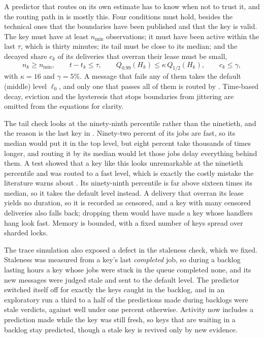 A predictor that routes on its own estimate has to know when not to trust it, and the routing path in  is mostly this. Four conditions must hold, besides the technical
ones that the boundaries have been published and that the key is valid. The key must have at least $n_{\min}$ observations; it must have been active within the last $\tau$, which is thirty minutes;
its tail must be close to its median; and the decayed share $c_k$ of its deliveries that overran their lease must be small,
\begin{equation}
  n_k \ge n_{\min},
  \qquad
  t - t_k \le \tau,
  \qquad
  Q_{0.99}(H_k) \le \kappa\,Q_{1/2}(H_k),
  \qquad
  c_k \le \gamma,
  \label{eq:trust}
\end{equation}
with $\kappa=16$ and $\gamma=5\%$. A message that fails any of them takes the default (middle) level $\ell_0$, and only one that passes all of them is routed by .
Time-based decay, eviction and the hysteresis that stops boundaries from jittering are omitted from the equations for clarity.

The tail check looks at the ninety-ninth percentile rather than the ninetieth, and the reason is the last key in . Ninety-two percent of its jobs are fast, so its median would
put it in the top level, but eight percent take thousands of times longer, and routing it by its median would let those jobs delay everything behind them. A test showed that a key like this looks unremarkable at
the ninetieth percentile and was routed to a fast level, which is exactly the costly mistake the literature warns about \citep{dellamico2014}. Its ninety-ninth percentile is far above sixteen times its
median, so it takes the default level instead. A delivery that overran its lease yields no duration, so it is recorded as censored, and a key with many censored deliveries also falls back; dropping them
would have made a key whose handlers hang look fast. Memory is bounded, with a fixed number of keys spread over sharded locks.

The trace simulation also exposed a defect in the staleness check, which we fixed. Staleness was measured from a key's last \emph{completed} job, so during a backlog lasting hours a key whose jobs were stuck in the queue completed
none, and its new messages were judged stale and sent to the default level. The predictor switched itself off for exactly the keys caught in the backlog, and in an exploratory run a third to a half of the
predictions made during backlogs were stale verdicts, against well under one percent otherwise. Activity now includes a prediction made while the key was still fresh, so keys that are waiting in a backlog stay
predicted, though a stale key is revived only by new evidence.

